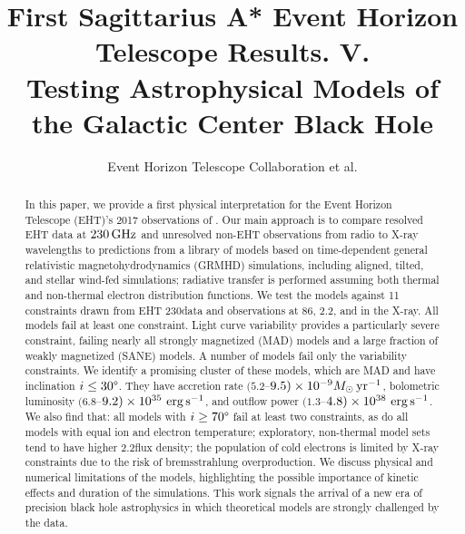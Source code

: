 \documentclass[twocolumn,twocolappendix,tighten,dvipsnames,linenumbers]{aastex63}
\begin{document}
\title{First Sagittarius A* Event Horizon Telescope Results. V.\\
  Testing Astrophysical Models of the Galactic Center Black Hole}

%
\author{Event Horizon Telescope Collaboration et al.}


\received{\today}
\revised{\today}

\begin{abstract}
  In this paper, we provide a first physical interpretation for the Event Horizon Telescope (EHT)'s 2017 observations of \sgra.
  Our main approach is to compare resolved EHT data at $230\,\mathrm{GHz}$ and unresolved non-EHT observations from radio to X-ray wavelengths to predictions from a library of models based on time-dependent general relativistic magnetohydrodynamics (GRMHD) simulations, including aligned, tilted, and stellar wind-fed simulations; radiative transfer is performed assuming both thermal and non-thermal electron distribution functions. We test the models against 11 constraints drawn from EHT 230\GHz data and observations at 86\GHz, 2.2\um, and in the X-ray.
  All models fail at least one constraint.
  Light curve variability provides a particularly severe constraint, failing nearly all strongly magnetized (MAD) models and a large fraction of weakly magnetized (SANE) models.
  A number of models fail only the variability constraints.  We identify a promising cluster of these models, which are MAD and have inclination $i \le 30\degree$.
  They  have accretion rate $(5.2$--$9.5)\times10^{-9}M_\odot\,\mathrm{yr}^{-1}$, bolometric luminosity $(6.8$--$9.2)\times10^{35}\,\,\mathrm{erg}\,\mathrm{s}^{-1}$, and outflow power $(1.3$--$4.8)\times10^{38}\,\,\mathrm{erg}\,\mathrm{s}^{-1}$.
  We also find that: all models with $i \ge 70\degree$ fail at least two constraints, as do all models with equal ion and electron temperature;  exploratory, non-thermal model sets tend to have higher 2.2\um flux density; the population of cold electrons is limited by X-ray constraints due to the risk of bremsstrahlung overproduction.
  We discuss physical and numerical limitations of the models, highlighting the possible importance of kinetic effects and duration of the simulations.
  This work signals the arrival of a new era of precision black hole astrophysics in which theoretical models are strongly challenged by the data.
\end{abstract}
\end{document}

